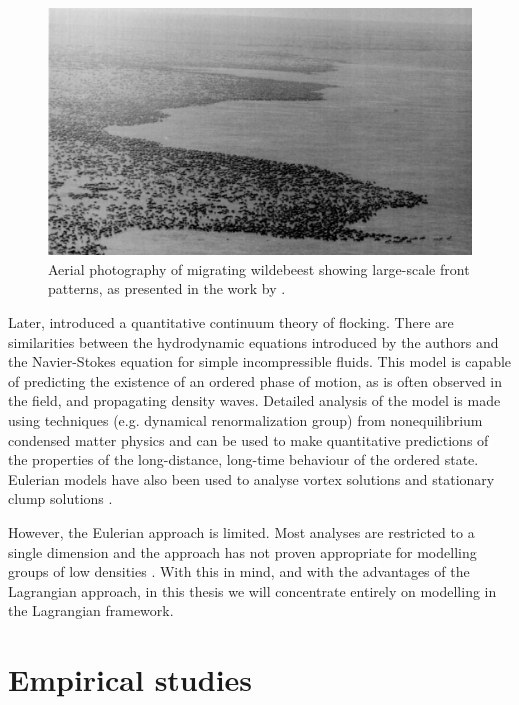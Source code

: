 \begin{figure}[tb]
    \includegraphics[width=\textwidth]{wildebeest.png}
    \caption{Aerial photography of migrating wildebeest showing large-scale front
    patterns, as presented in the work by \textcite{gueron93}.}
    \label{fig:wildebeest}
\end{figure}

Later, \textcite{toner98} introduced a quantitative continuum theory of flocking. There
are similarities between the hydrodynamic equations introduced by the authors and the
Navier-Stokes equation for simple incompressible fluids. This model is capable of
predicting the existence of an ordered phase of motion, as is often observed in the field,
and propagating density waves. Detailed analysis of the model is made using techniques
(e.g. dynamical renormalization group) from nonequilibrium condensed matter physics and
can be used to make quantitative predictions of the properties of the long-distance,
long-time behaviour of the ordered state. Eulerian models have also been used to analyse
vortex solutions \parencite{topaz04} and stationary clump solutions \parencite{topaz06}.

However, the Eulerian approach is limited. Most analyses are restricted to a single
dimension and the approach has not proven appropriate for modelling groups of low
densities \parencite{giardina08}. With this in mind, and with the advantages of the
Lagrangian approach, in this thesis we will concentrate entirely on modelling in the
Lagrangian framework.

\section{Empirical studies}
\label{sec:empirical_studies}

